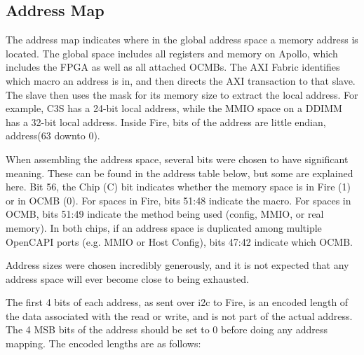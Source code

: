 \subsection{Address Map}
The address map indicates where in the global address space a memory
address is located. The global space includes all registers and memory
on Apollo, which includes the FPGA as well as all attached OCMBs. The
AXI Fabric identifies which macro an address is in, and then directs
the AXI transaction to that slave. The slave then uses the mask for
its memory size to extract the local address. For example, C3S has a
24-bit local address, while the MMIO space on a DDIMM has a 32-bit
local address. Inside Fire, bits of the address are little endian,
address(63 downto 0).

When assembling the address space, several bits were chosen to have
significant meaning. These can be found in the address table below,
but some are explained here. Bit 56, the Chip (C) bit indicates
whether the memory space is in Fire (1) or in OCMB (0). For spaces in
Fire, bits 51:48 indicate the macro. For spaces in OCMB, bits 51:49
indicate the method being used (config, MMIO, or real memory). In both
chips, if an address space is duplicated among multiple OpenCAPI ports
(e.g. MMIO or Host Config), bits 47:42 indicate which OCMB.

Address sizes were chosen incredibly generously, and it is not
expected that any address space will ever become close to being
exhausted.

The first 4 bits of each address, as sent over i2c to Fire, is an
encoded length of the data associated with the read or write, and is
not part of the actual address. The 4 MSB bits of the address should
be set to 0 before doing any address mapping. The encoded lengths are as follows:


